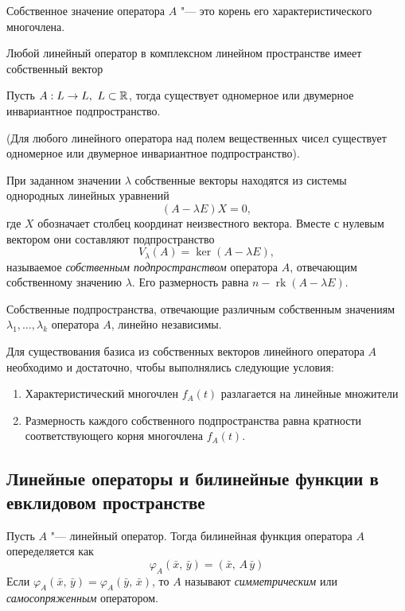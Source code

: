 \begin{theorem}
  Собственное значение оператора $A$ "--- это корень его характеристического многочлена.
\end{theorem}

\begin{theorem}
  Любой линейный оператор в комплексном линейном пространстве имеет собственный вектор
\end{theorem}

\begin{theorem}
  Пусть $A: L \to L,~ L \subset \mathbb{R}$, тогда существует одномерное или двумерное инвариантное подпространство.

  (Для любого линейного оператора над полем вещественных чисел существует одномерное или двумерное инвариантное подпространство).
\end{theorem}

При заданном значении $\lambda$ собственные векторы находятся из системы однородных линейных уравнений
$$
  (A - \lambda E)X = 0,
$$
где $X$ обозначает столбец координат неизвестного вектора. Вместе с нулевым вектором они составляют подпространство
$$
  V_\lambda(A) = \ker(A - \lambda E),
$$
называемое \textit{собственным подпространством} оператора $A$, отвечающим собственному значению $\lambda$. Его размерность равна $n - \operatorname{rk}(A - \lambda E)$.

\begin{theorem}
  Собственные подпространства, отвечающие различным собственным значениям $\lambda_1, \ldots, \lambda_k$ оператора $A$, линейно независимы.
\end{theorem}

\begin{theorem}
  Для существования базиса из собственных векторов линейного оператора $A$ необходимо и достаточно, чтобы выполнялись следующие условия:
  \begin{enumerate}
    \item Характеристический многочлен $f_A(t)$ разлагается на линейные множители
    \item Размерность каждого собственного подпространства равна кратности соответствующего корня многочлена $f_A(t)$.
  \end{enumerate}
\end{theorem}

\subsection*{Линейные операторы и билинейные функции в евклидовом пространстве}
\begin{definition}
  Пусть $A$ "--- линейный оператор. Тогда билинейная функция оператора $A$ опеределяется как
  $$
    \varphi_A(\bar{x}, \, \bar{y}) = (\bar{x}, \, A\, \bar{y}) 
  $$
  Если $\varphi_A(\bar{x}, \, \bar{y}) = \varphi_A(\bar{y},\, \bar{x})$, то $A$ называют \textit{симметрическим} или \textit{самосопряженным} оператором.
\end{definition}


